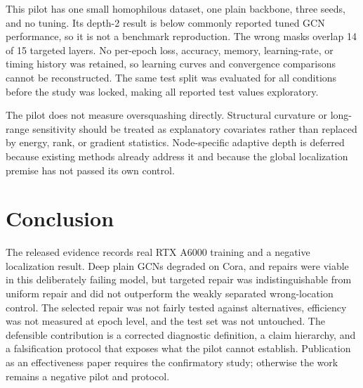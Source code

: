 \documentclass[journal]{IEEEtran}
\begin{document}
This pilot has one small homophilous dataset, one plain backbone, three seeds, and no tuning. Its depth-2 result is below commonly reported tuned GCN performance, so it is not a benchmark reproduction. The wrong masks overlap 14 of 15 targeted layers. No per-epoch loss, accuracy, memory, learning-rate, or timing history was retained, so learning curves and convergence comparisons cannot be reconstructed. The same test split was evaluated for all conditions before the study was locked, making all reported test values exploratory.

The pilot does not measure oversquashing directly. Structural curvature or long-range sensitivity should be treated as explanatory covariates rather than replaced by energy, rank, or gradient statistics. Node-specific adaptive depth is deferred because existing methods already address it and because the global localization premise has not passed its own control.

\section{Conclusion}

The released evidence records real RTX A6000 training and a negative localization result. Deep plain GCNs degraded on Cora, and repairs were viable in this deliberately failing model, but targeted repair was indistinguishable from uniform repair and did not outperform the weakly separated wrong-location control. The selected repair was not fairly tested against alternatives, efficiency was not measured at epoch level, and the test set was not untouched. The defensible contribution is a corrected diagnostic definition, a claim hierarchy, and a falsification protocol that exposes what the pilot cannot establish. Publication as an effectiveness paper requires the confirmatory study; otherwise the work remains a negative pilot and protocol.



\end{document}
